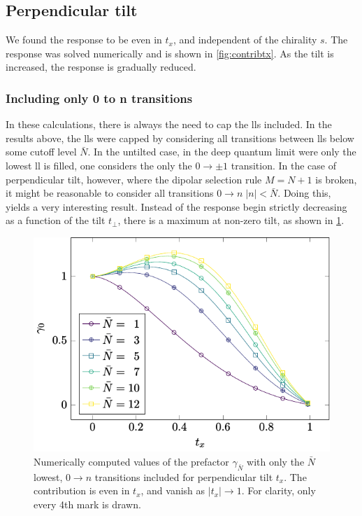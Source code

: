 \documentclass[%
 reprint,
 amsmath,amssymb,
 aps,
]{revtex4-2}
\begin{document}
\subsection{Perpendicular tilt}
We found the response to be even in \( t_x \), and independent of the chirality \( s \).
The response was solved numerically and is shown in \cref{fig:contribtx}.
As the tilt is increased, the response is gradually reduced.

\subsubsection{Including only 0 to n transitions}
In these calculations, there is always the need to cap the \glspl{ll} included.
In the results above, the \glspl{ll} were capped by considering all transitions between \glspl{ll} below some cutoff level \( \bar{N} \).
In the untilted case, in the deep quantum limit were only the lowest \gls{ll} is filled, one considers the only the \( 0\to \pm 1 \) transition.
In the case of perpendicular tilt, however, where the dipolar selection rule \( M=N+1 \) is broken, it might be reasonable to consider all transitions \( 0\to n \; |n| < \bar{N} \).
Doing this, yields a very interesting result.
Instead of the response begin strictly decreasing as a function of the tilt \( t_\perp \), there is a maximum at non-zero tilt, as shown in \cref{fig:0tontx}.
\begin{figure}[htb]
  \centering
  \vspace{0.5em} %
  \includegraphics[width=.7\columnwidth]{figures/contribtx-zerothll}
  \caption{Numerically computed values of the prefactor \( \gamma_{\bar{N}} \) with only the \( \bar{N}\) lowest, \( 0\to n\) transitions included for perpendicular tilt \( t_x \).
    The contribution is even in \( t_x \), and vanish as \( |t_x| \to 1 \).
    For clarity, only every 4th mark is drawn.\label{fig:0tontx}}
\end{figure}
\end{document}
